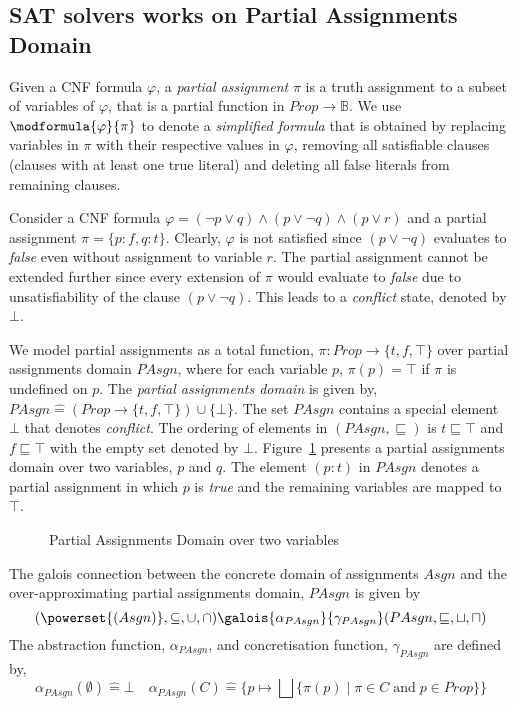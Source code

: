 \subsection{SAT solvers works on Partial Assignments Domain}
Given a CNF formula $\varphi$, a \emph{partial assignment} $\pi$ is 
a truth assignment to a subset of variables of $\varphi$, that is a 
partial function in $Prop \rightarrow \mathbb{B}$. We use 
$\modformula{\varphi}{\pi}$ to denote a \emph{simplified formula} 
that is obtained by replacing variables in $\pi$ with their respective
values in $\varphi$, removing all satisfiable clauses (clauses with at least 
one true literal) and deleting all false literals from remaining clauses.
%
\begin{example}
  Consider a CNF formula $\varphi = (\neg p \vee q) \wedge (p \vee \neg q)  
  \wedge (p \vee r)$ and a partial assignment $\pi=\{p:f,q:t\}$.  Clearly,
  $\varphi$ is not satisfied since $(p \vee \neg q)$ evaluates to \emph{false} 
  even without assignment to variable $r$. The partial assignment cannot be
  extended further since every extension of $\pi$ would evaluate to
  \emph{false} due to unsatisfiability of the clause $(p \vee \neg q)$. This
  leads to a \emph{conflict} state, denoted by $\bot$.  
\end{example}
%
We model partial assignments as a total function, 
$\pi: Prop \rightarrow \{t,f,\top\}$ over partial assignments domain $PAsgn$, 
where for each variable $p$, $\pi(p) = \top$ if $\pi$ is undefined on $p$. 
The \emph{partial assignments domain} is given by, 
$PAsgn \mathrel{\hat=} (Prop \rightarrow \{t,f,\top\}) \cup \{\bot\}$. 
The set $PAsgn$ contains a special element $\bot$ that denotes \emph{conflict}. 
The ordering of elements in $(PAsgn, \sqsubseteq)$
is $t \sqsubseteq \top$ and $f \sqsubseteq \top$ with the empty set denoted by
$\bot$. Figure~\ref{fig:pasgn} presents a partial assignments domain over two 
variables, $p$ and $q$.  The element $(p:t)$ in $PAsgn$ denotes a partial 
assignment in which $p$ is \emph{true} and the remaining variables are mapped 
to $\top$. 
%
\begin{figure}[htbp]
\centering
\vspace*{-0.2cm}
\caption{Partial Assignments Domain over two variables \label{fig:pasgn}}
\end{figure}
%
The galois connection between the concrete domain of assignments $Asgn$ and 
the over-approximating partial assignments domain, $PAsgn$ is given by 
\[  
    (\powerset{(Asgn)},\subseteq,\cup,\cap)
    \galois{\alpha_{PAsgn}}{\gamma_{PAsgn}}
    (PAsgn,\sqsubseteq,\sqcup,\sqcap)
\]
%
The abstraction function, $\alpha_{PAsgn}$, and concretisation function,
$\gamma_{PAsgn}$ are defined by,
\begin{equation*}
  \alpha_{PAsgn}(\emptyset) \mathrel{\hat=} \bot
  \quad 
  \alpha_{PAsgn}(C) \mathrel{\hat=} \{ p \mapsto \bigsqcup \{\pi(p) \mid \pi \in
  C\; \text{and}\; p \in Prop\} \} 
\end{equation*}

